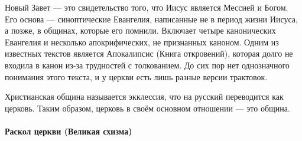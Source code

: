
Новый Завет --- это свидетельство того, что Иисус является Мессией и Богом. Его основа --- синоптические Евангелия, написанные не в период жизни Иисуса, а позже, в общинах, которые его помнили. Включает четыре канонических Евангелия и несколько апокрифических, не признанных каноном. Одним из известных текстов является Апокалипсис (Книга откровений), которая долго не входила в канон из-за трудностей с толкованием. До сих пор нет однозначного понимания этого текста, и у церкви есть лишь разные версии трактовок.

Христианская община называется экклессия, что на русский переводится как церковь. Таким образом, церковь в своём основном отношении --- это община.

\paragraph{Раскол церкви (Великая схизма)}

